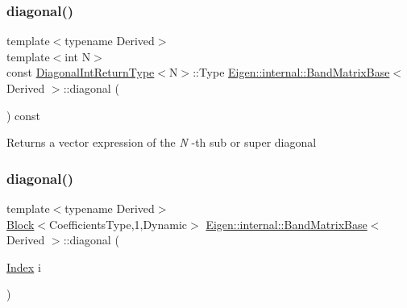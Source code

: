\subsubsection{\texorpdfstring{diagonal()}{diagonal()}\hspace{0.1cm}{\footnotesize\ttfamily [4/6]}}
{\footnotesize\ttfamily template$<$typename Derived$>$ \\
template$<$int N$>$ \\
const \mbox{\hyperlink{struct_eigen_1_1internal_1_1_band_matrix_base_1_1_diagonal_int_return_type}{Diagonal\+Int\+Return\+Type}}$<$N$>$\+::Type \mbox{\hyperlink{class_eigen_1_1internal_1_1_band_matrix_base}{Eigen\+::internal\+::\+Band\+Matrix\+Base}}$<$ Derived $>$\+::diagonal (\begin{DoxyParamCaption}{ }\end{DoxyParamCaption}) const\hspace{0.3cm}{\ttfamily [inline]}}

\begin{DoxyReturn}{Returns}
a vector expression of the {\itshape N} -\/th sub or super diagonal 
\end{DoxyReturn}
\mbox{\label{class_eigen_1_1internal_1_1_band_matrix_base_a51ce12f0be57b0c2593c20c865de6af1}} 
\subsubsection{\texorpdfstring{diagonal()}{diagonal()}\hspace{0.1cm}{\footnotesize\ttfamily [5/6]}}
{\footnotesize\ttfamily template$<$typename Derived$>$ \\
\mbox{\hyperlink{class_eigen_1_1_block}{Block}}$<$Coefficients\+Type,1,Dynamic$>$ \mbox{\hyperlink{class_eigen_1_1internal_1_1_band_matrix_base}{Eigen\+::internal\+::\+Band\+Matrix\+Base}}$<$ Derived $>$\+::diagonal (\begin{DoxyParamCaption}\item[{\mbox{\hyperlink{struct_eigen_1_1_eigen_base_a554f30542cc2316add4b1ea0a492ff02}{Index}}}]{i }\end{DoxyParamCaption})\hspace{0.3cm}{\ttfamily [inline]}}

